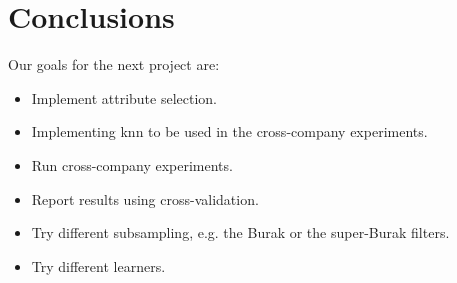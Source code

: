 \documentclass{sig-alternate}
\begin{document}
\section{Conclusions}
Our goals for the next project are:
\begin{itemize}
\item{Implement attribute selection.}
\item{Implementing knn to be used in the cross-company experiments.}
\item{Run cross-company experiments.}
\item{Report results using cross-validation.}
\item{Try different subsampling, e.g. the Burak or the super-Burak filters.}
\item{Try different learners.}
\end{itemize}


%
%

\end{document}
